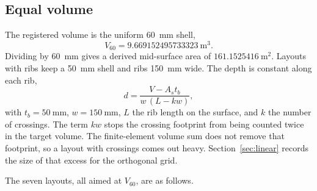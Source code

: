 \documentclass[11pt,a4paper]{article}
\begin{document}
\subsection{Equal volume}

The registered volume is the uniform 60~mm shell,
\begin{equation}
V_{60} = 9.669152495733323~\mathrm{m^{3}}.
\label{eq:v60}
\end{equation}
Dividing by 60~mm gives a derived mid-surface area of \(161.1525416~\mathrm{m^{2}}\).
Layouts with ribs keep a 50~mm shell and ribs 150~mm wide.
The depth is constant along each rib,
\begin{equation}
d = \frac{V - A_s t_b}{w\,(L - kw)},
\label{eq:depth}
\end{equation}
with \(t_b = 50~\mathrm{mm}\), \(w = 150~\mathrm{mm}\), \(L\) the rib length on the surface, and \(k\) the number of crossings.
The term \(kw\) stops the crossing footprint from being counted twice in the target volume.
The finite-element volume sum does not remove that footprint, so a layout with crossings comes out heavy.
Section~\ref{sec:linear} records the size of that excess for the orthogonal grid.

The seven layouts, all aimed at \(V_{60}\), are as follows.
\end{document}

